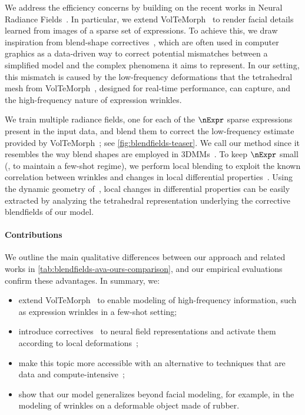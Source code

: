   We address the efficiency concerns by building on the recent works in Neural
  Radiance Fields~\cite{garbin2024voltemorph,xu2022deforming,yuan2022nerf}.
  In particular, we extend VolTeMorph~\cite{garbin2024voltemorph} to render
  facial details learned from images of a sparse set of expressions.
  To achieve this, we draw inspiration from blend-shape
  correctives~\cite{lewis2014practice}, which are often used in computer
  graphics as a data-driven way to correct potential mismatches between a
  simplified model and the complex phenomena it aims to represent.
  In our setting, this mismatch is caused by the low-frequency deformations
  that the tetrahedral mesh from VolTeMorph~\cite{garbin2024voltemorph},
  designed for real-time performance, can capture, and the high-frequency
  nature of expression \mbox{wrinkles}.

  We train multiple radiance fields, one for each of the $\nExpr$ sparse
  expressions present in the input data, and blend them to correct the
  low-frequency estimate provided by VolTeMorph~\cite{garbin2024voltemorph};
  see \cref{fig:blendfields-teaser}.
  We call our method \blendfields since it resembles the way blend shapes are
  employed in 3DMMs~\cite{blanz1999morphable}.
  To keep $\nExpr$ small (\ie, to maintain a few-shot regime), we perform
  local blending to exploit the known correlation between wrinkles and changes
  in local differential properties~\cite{irving2004invertible, raman2022mesh}.
  Using the dynamic geometry of~\cite{garbin2024voltemorph}, local changes in
  differential properties can be easily extracted by analyzing the tetrahedral
  representation underlying the corrective blendfields of our model.

  \paragraph{Contributions}
    We outline the main qualitative differences between our approach and
    related works in \cref{tab:blendfields-ava-ours-comparison}, and our
    empirical evaluations confirm these advantages.
    In summary, we:
    \begin{itemize}
      \item extend VolTeMorph~\cite{garbin2024voltemorph} to enable modeling of high-frequency information, such as expression wrinkles in a few-shot setting;
      \item introduce correctives~\cite{blanz1999morphable} to neural field representations and activate them according to local deformations~\cite{raman2022mesh};
      \item
            make this topic more accessible
            with an alternative to techniques that are data and compute-intensive~\cite{cao2022authentic};
      \item show that our model generalizes beyond facial modeling, for example, in the modeling of wrinkles on a deformable object made of rubber.
    \end{itemize}
    